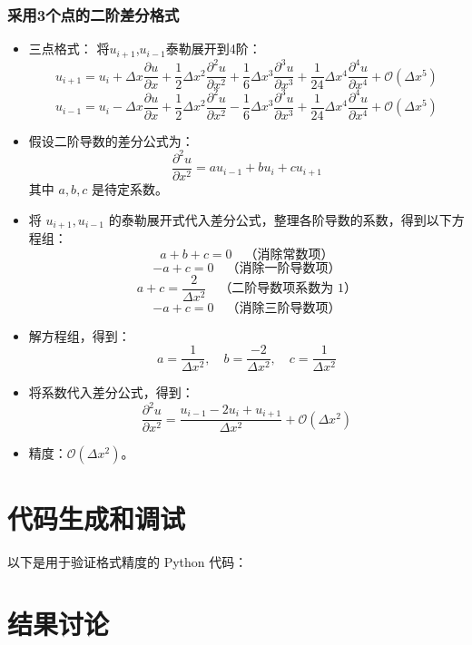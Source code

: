 \documentclass[12pt,a4paper]{article}
\begin{document}
\subsubsection{采用3个点的二阶差分格式}
\begin{itemize}
    \item 三点格式：
    将$u_{i+1}$,$u_{i-1}$泰勒展开到4阶：
    \[u_{i+1} = u_i + \Delta x \frac{\partial u}{\partial x} + \frac{1}{2} \Delta x^2 \frac{\partial^2 u}{\partial x^2} + \frac{1}{6} \Delta x^3 \frac{\partial^3 u}{\partial x^3} + \frac{1}{24} \Delta x^4 \frac{\partial^4 u}{\partial x^4} + \mathcal{O}(\Delta x^5)\]
    \[u_{i-1} = u_i - \Delta x \frac{\partial u}{\partial x} + \frac{1}{2} \Delta x^2 \frac{\partial^2 u}{\partial x^2} -\frac{1}{6} \Delta x^3 \frac{\partial^3 u}{\partial x^3} + \frac{1}{24} \Delta x^4 \frac{\partial^4 u}{\partial x^4} + \mathcal{O}(\Delta x^5)\]
    \item 假设二阶导数的差分公式为：
    \[
    \frac{\partial^2 u}{\partial x^2} = a u_{i-1} + b u_i + c u_{i+1}
    \]
    其中 \( a, b, c \) 是待定系数。

    \item 将 \( u_{i+1}, u_{i-1} \) 的泰勒展开式代入差分公式，整理各阶导数的系数，得到以下方程组：
    \[
    a + b + c  = 0 \quad \text{（消除常数项）}
    \]
    \[
    -a + c  = 0 \quad \text{（消除一阶导数项）}
    \]
    \[
    a + c = \frac{2}{\Delta x^2} \quad \text{（二阶导数项系数为 1）}
    \]
    \[
    -a + c= 0 \quad \text{（消除三阶导数项）}
    \]
    

    \item 解方程组，得到：
    \[
    a = \frac{1}{\Delta x^2}, \quad b = \frac{-2}{\Delta x^2}, \quad c = \frac{1}{\Delta x^2}
    \]

    \item 将系数代入差分公式，得到：
    \[
    \frac{\partial^2 u}{\partial x^2} = \frac{u_{i-1} - 2 u_i + u_{i+1} }{\Delta x^2} + \mathcal{O}(\Delta x^2)
    \]

    \item 精度：$\mathcal{O}(\Delta x^2)$。
    
    
\end{itemize}

\section{代码生成和调试}
以下是用于验证格式精度的 Python 代码：


\section{结果讨论}
\end{document}
